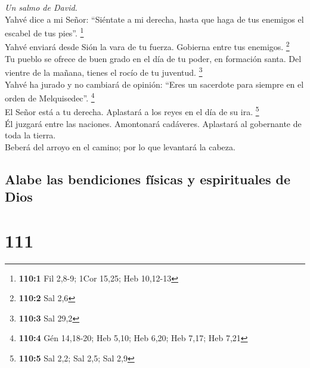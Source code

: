 \emph{Un salmo de David.}\\
 Yahvé dice a mi Señor: ``Siéntate a mi derecha, hasta que
haga de tus enemigos el escabel de tus pies''. \footnote{\textbf{110:1}
  Fil 2,8-9; 1Cor 15,25; Heb 10,12-13}\\
 Yahvé enviará desde Sión la vara de tu fuerza. Gobierna
entre tus enemigos. \footnote{\textbf{110:2} Sal 2,6}\\
 Tu pueblo se ofrece de buen grado en el día de tu poder,
en formación santa. Del vientre de la mañana, tienes el rocío de tu
juventud. \footnote{\textbf{110:3} Sal 29,2}\\
 Yahvé ha jurado y no cambiará de opinión: ``Eres un
sacerdote para siempre en el orden de Melquisedec''. \footnote{\textbf{110:4}
  Gén 14,18-20; Heb 5,10; Heb 6,20; Heb 7,17; Heb 7,21}\\
 El Señor está a tu derecha. Aplastará a los reyes en el
día de su ira. \footnote{\textbf{110:5} Sal 2,2; Sal 2,5; Sal 2,9}\\
 Él juzgará entre las naciones. Amontonará cadáveres.
Aplastará al gobernante de toda la tierra.\\
 Beberá del arroyo en el camino; por lo que levantará la
cabeza.

\hypertarget{alabe-las-bendiciones-fuxedsicas-y-espirituales-de-dios}{%
\subsection{Alabe las bendiciones físicas y espirituales de
Dios}\label{alabe-las-bendiciones-fuxedsicas-y-espirituales-de-dios}}

\hypertarget{section-108}{%
\section{111}\label{section-108}}

